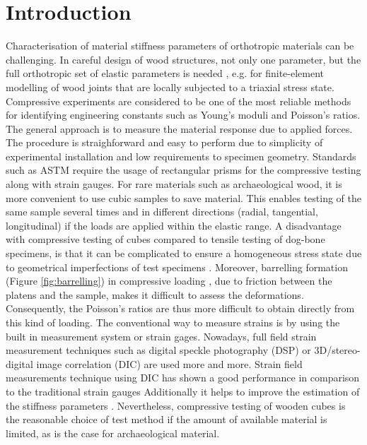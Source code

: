\documentclass[review]{elsarticle}
\begin{document}
\linenumbers

\section{Introduction}

Characterisation of material stiffness parameters of orthotropic materials can
be challenging. In  careful design of wood structures, not only one parameter, but the full
orthotropic set of elastic parameters is needed \cite{tsoumis1991science},
e.g. for finite-element modelling of wood joints that are locally subjected to a
triaxial stress state. Compressive experiments are considered to be one of the most reliable methods for identifying engineering constants such as Young's moduli and Poisson's
ratios. The general approach is to measure the material response due to applied
forces. The procedure is straighforward and easy to perform due to simplicity of experimental installation and low requirements to specimen
geometry. Standards such as ASTM \cite{standard1997d143,
johnson1983compression} require the usage of rectangular prisms for
the compressive testing along with strain gauges.
For rare materials such as archaeological wood, it is more convenient to use
cubic samples \cite{ljungdahl2007transverse} to save material. 
This enables testing of the same sample several times and in
different directions (radial, tangential, longitudinal) if the loads are
applied within the elastic range.
A disadvantage with compressive testing of cubes compared to tensile testing of
dog-bone specimens, is that it can be complicated to ensure a homogeneous stress state
due to geometrical imperfections of test specimens \cite{Toftegaard1999849}.
Moreover, barrelling formation (Figure \ref{fig:barrelling}) in compressive
loading \cite{oldroyd1966stress}, due to friction between the platens and the
sample, makes it difficult to assess the  deformations.
Consequently, the Poisson's ratios are thus more difficult to obtain directly from this kind
of loading.
The conventional way to measure strains is by using the built in measurement
system or strain gages. Nowadays, full field strain measurement techniques such
as digital speckle photography (DSP) \cite{synnergren1999stereoscopic} or
3D/stereo-digital image correlation (DIC) \cite{majano2012test} are used more
and more. Strain field measurements technique using DIC has shown a good
performance in comparison to the traditional strain gauges
\cite{huang2010optical,xavier2012stereovision} Additionally it helps to
improve the estimation of the stiffness parameters \cite{dahl2009planar,
majano2012test, ozyhar2013moisture}. 
Nevertheless, compressive testing of wooden cubes is the reasonable 
choice of test method if the amount of available material is limited, as is the case for archaeological material.
\end{document}

